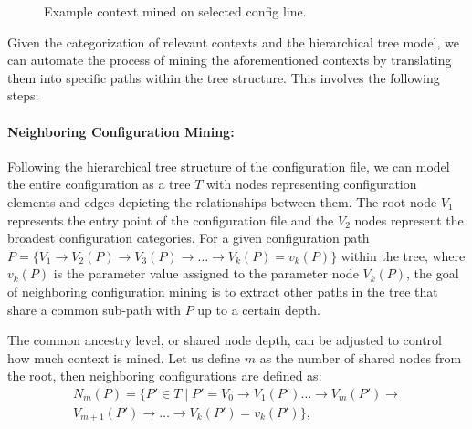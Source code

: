 \begin{figure}[t]
    \centering
    \caption{Example context mined on selected config line.}
    \label{fig:context_mine}
\end{figure}

Given the categorization of relevant contexts and the hierarchical tree model, we can automate the process of mining the aforementioned contexts by translating them into specific paths within the tree structure. This involves the following steps:

\paragraph{Neighboring Configuration Mining:}
    Following the hierarchical tree structure of the configuration file, we can model the entire configuration as a tree \( T \) with nodes representing configuration elements and edges depicting the relationships between them. The root node \(V_1\) represents the entry point of the configuration file and the \(V_2\) nodes represent the broadest configuration categories.
    For a given configuration path \( P = \{ V_1 \rightarrow V_2(P) \rightarrow V_3(P) \rightarrow \dots \rightarrow V_k(P) = v_k(P) \} \) within the tree, where \( v_k(P) \) is the parameter value assigned to the parameter node \( V_k(P) \), the goal of neighboring configuration mining is to extract other paths in the tree that share a common sub-path with \( P \) up to a certain depth. 
    
    The common ancestry level, or shared node depth, can be adjusted to control how much context is mined. Let us define \( m \) as the number of shared nodes from the root, then neighboring configurations are defined as:
\begin{multline*}
N_m(P) = \{ P' \in T \mid P' = V_0 \rightarrow  V_1(P')\dots \rightarrow V_m(P') \rightarrow \\ V_{m+1}(P') \rightarrow \dots \rightarrow V_k(P')= v_k(P') \},
\end{multline*}


